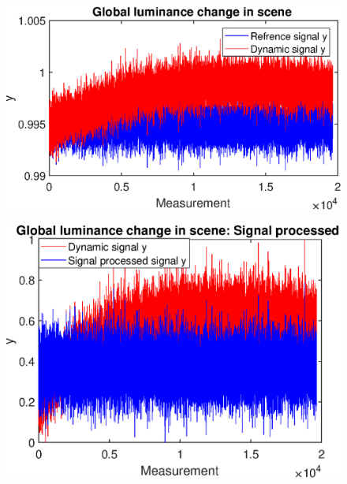 \begin{figure}[H]
    \centering
\begin{minipage}[t]{0.495\textwidth}
    \includegraphics[width=1\textwidth]{result/dynamic/lum/intense_change.eps}
    \label{fig:lum_sig_1}
\end{minipage}
\begin{minipage}[t]{0.495\textwidth}
    \includegraphics[width = \textwidth]{result/dynamic/lum/intense_change_sp.eps}
    \label{fig:lum_sig_2}
\end{minipage}
\begin{minipage}[t]{0.495\textwidth}

\end{minipage}
\end{figure}
